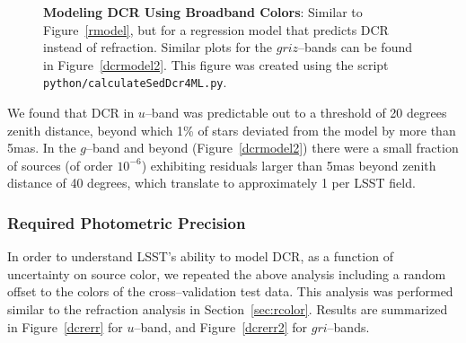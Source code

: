 \documentclass[DM,toc]{lsstdoc}
\begin{document}
\begin{figure}[!t]
    \centering
    \caption{\textbf{Modeling DCR Using Broadband Colors}: Similar to
      Figure~\ref{rmodel}, but for a regression model that predicts
      DCR instead of refraction.  Similar plots for the $griz$--bands
      can be found in Figure~\ref{dcrmodel2}.  This figure was created
      using the script \texttt{python/calculateSedDcr4ML.py}.}
    \label{dcrmodel}
\end{figure}

We found that DCR in $u$--band was predictable out to a threshold of
20 degrees zenith distance, beyond which 1\% of stars deviated from
the model by more than 5mas.  In the $g$--band and beyond
(Figure~\ref{dcrmodel2}) there were a small fraction of sources (of
order $10^{-6}$) exhibiting residuals larger than 5mas beyond zenith
distance of 40 degrees, which translate to approximately 1 per LSST
field.

\subsubsection{Required Photometric Precision}

In order to understand LSST's ability to model DCR, as a function of
uncertainty on source color, we repeated the above analysis including
a random offset to the colors of the cross--validation test data.
This analysis was performed similar to the refraction analysis in
Section~\ref{sec:rcolor}.  Results are summarized in
Figure~\ref{dcrerr} for $u$--band, and Figure~\ref{dcrerr2} for
$gri$--bands.
\end{document}
